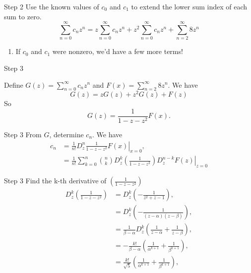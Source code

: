 \documentclass[portrait,fleqn,12pt]{beamer}
\newenvironment{handlist}
   {\begin{enumerate}[\faHandPointRight]
       \addtolength{\itemsep}{0.0\itemsep}}
     {\end{enumerate}}
\begin{document}
\begin{frame}{Step 2}
Use the known values of $c_0$ and $c_1$ to extend the lower sum index of each sum to zero.
\begin{equation}
  \sum_{n=0}^\infty c_{n} z^n  =  z \sum_{n=0}^\infty c_{n} z^{n} +  z^2 \sum_{n=0}^\infty c_{n} z^{n} +  \sum_{n=2}^\infty 8 z^n
\end{equation}
\begin{handlist}
\item If $c_0$ and $c_1$ were nonzero, we'd have a few more terms!
\end{handlist}
\end{frame}

\begin{frame}{Step 3}

Define $G(z) =  \sum_{n=0}^\infty c_{n} z^n$ and $F(x) = \sum_{n=2}^\infty 8 z^n$. We have
\begin{equation}
  G(z) = z G(z) + z^2 G(z) + F(z)
\end{equation}
So 
\begin{equation}
  G(z) = \frac{1}{1-z-z^2} F(x).
\end{equation}



\end{frame}
\begin{frame}{Step 3}
From $G$, determine $c_n$. We have
\begin{align*}
 c_n &= \frac{1}{n!}  \left. D^n_z  \frac{1}{1-z-z^2} F(x) \right  \vert_{x=0}, \\
       &= \frac{1}{n!}  \left. \sum_{k=0}^n \binom{n}{k} D^k_z \left( \frac{1}{1-z-z^2} \right)  D^{n-k} _z F(z )  \right \vert_{z=0} 
\end{align*}

\end{frame}

\begin{frame}{Step 3}
Find the k-th derivative of $\left( \frac{1}{1-z-z^2} \right) $
\begin{align*}
   D^k_z \left( \frac{1}{1-z-z^2} \right)  &=  D^k_z \left( -\frac{1}{z^2+z-1} \right) , \\
                                                             &=  D^k_z \left( -\frac{1}{(z-\alpha) (z-\beta) } \right),\\
                                                             &=  \frac{1}{\beta - \alpha} D^k_z \left( \frac{1}{z-\alpha} + \frac{1}{z-\beta}  \right), \\
                                                              &=  -\frac{k!}{\beta - \alpha} \left( \frac{1}{\alpha^{k+1}} + \frac{1}{\beta^{k+1} } \right), \\
                                                                &=  \frac{k!}{\sqrt{5}} \left( \frac{1}{\alpha^{k+1}} + \frac{1}{\beta^{k+1} } \right), \\
\end{align*}

\end{frame}
\end{document}
